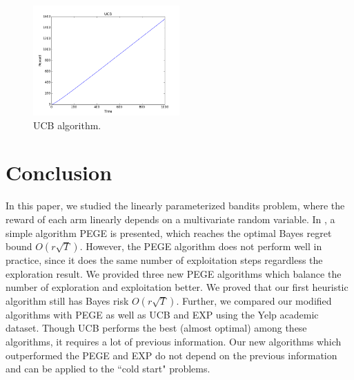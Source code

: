 \documentclass{article}
\theoremstyle{plain}
\theoremstyle{definition}
\begin{document}
\begin{figure}[htb]
{
\centering
\includegraphics[width=0.50\textwidth]{UCB1}
\caption{UCB algorithm. \label{fig: tah2}}
}
\end{figure}






\section{Conclusion}

In this paper, we studied the linearly parameterized bandits problem, where the reward of each arm linearly depends on a multivariate random variable. In \citet{Paat}, a simple algorithm PEGE is presented, which reaches the optimal Bayes regret bound $O(r\sqrt{T})$. However, the PEGE algorithm does not perform well in practice, since it does the same number of exploitation steps regardless the exploration result. We provided three new PEGE algorithms which balance the number of exploration and exploitation better. We proved that our first heuristic algorithm still has Bayes risk $O(r\sqrt{T})$. Further, we compared our modified algorithms with PEGE as well as UCB and EXP using the Yelp academic dataset. Though UCB performs the best (almost optimal) among these algorithms, it requires a lot of previous information. Our new algorithms which outperformed the PEGE and EXP do not depend on the previous information and can be applied to the ``cold start" problems.


\nocite{langley00}





%
%
%
\end{document}
